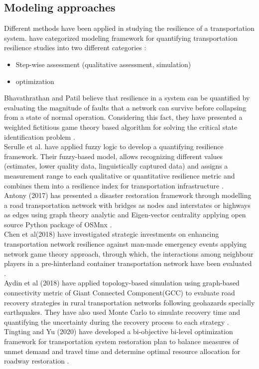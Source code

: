 \documentclass[11pt,twoside]{article}
\numberwithin{equation}{section}
\newcommand{\?}{\stackrel{?}{=}}
\begin{document}
\subsection{Modeling approaches}
Different methods have been applied in studying the resilience of a transportation system. \citet{ahmed2020resilience} have categorized modeling framework for quantifying transportation resilience studies into two different categories \citep{ahmed2020resilience}:
 \begin{itemize}
   \item Step-wise assessment (qualitative assessment, simulation)
   \item optimization
 \end{itemize}
Bhavathrathan and Patil believe that resilience in a system can be quantified by evaluating the magnitude of faults that a network can survive before collapsing from a state of normal operation. Considering this fact, they have presented a weighted fictitious game theory based algorithm for solving the critical state identification problem \citep{bhavathrathan2018algorithm}.\\
Serulle et al. have applied fuzzy logic to develop a quantifying resilience framework. Their fuzzy-based model, allows recognizing different values (estimates, lower quality data, linguistically captured data) and assigns a measurement range to each qualitative or quantitative resilience metric and combines them into a resilience index for transportation infrastructure \citep{serulle2011resiliency}.\\
Antony (2017) has presented a disaster restoration framework through modelling a road transportation network with bridges as nodes and interstates or highways as edges using graph theory analytic and Eigen-vector centrality applying  open source Python package of OSMnx \citep{antony2017developing}.\\
Chen et al(2018) have investigated strategic investments on enhancing transportation network resilience against man-made emergency events applying network game theory approach, through which, the interactions among neighbour players in a pre-hinterland container transportation network have been evaluated \citep{hong2018strategic}.\\
Aydin et al (2018) have applied topology-based simulation using graph-based connectivity metric of Giant Connected Component(GCC) to evaluate road recovery strategies in rural transportation networks following geohazards specially earthquakes. They have also used Monte Carlo to simulate recovery time and quantifying the uncertainty during the recovery process to each strategy \citep{aydin2018framework}.\\
Tingting and Yu (2020) have developed a bi-objective bi-level optimization framework for transportation system restoration plan to balance measures of unmet demand and travel time and determine optimal resource allocation for roadway restoration \citep{tingting2020transportation}.
\end{document}
